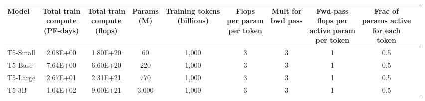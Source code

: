 \documentclass{article}
\begin{document}
\begin{table}[!h]

\begin{adjustwidth}{-.6in}{-.6in}
{
    \tiny
    \centering
        \footnotesize
        \begin{center}
            \begin{tabular}{lccccccccc}
                     Model & \shortstack{Total train\\ compute \\ (PF-days)} & \shortstack{Total train \\compute \\ (flops)} & \shortstack{Params \\(M)} & \shortstack{Training tokens\\ (billions)} & \shortstack{Flops \\ per param \\ per token} & \shortstack{Mult for\\ bwd pass} & \shortstack{Fwd-pass \\ flops per \\ active param \\ per token} & \shortstack{Frac of\\ params active\\ for each\\ token} \\
            \midrule
                  T5-Small &                      2.08E+00 &                    1.80E+20 &         60 &                      1,000 &                               3 &                       3 &                                         1 &                                      0.5 &   \\
                   T5-Base &                      7.64E+00 &                    6.60E+20 &        220 &                      1,000 &                               3 &                       3 &                                         1 &                                      0.5 &   \\
                  T5-Large &                      2.67E+01 &                    2.31E+21 &        770 &                      1,000 &                               3 &                       3 &                                         1 &                                      0.5 &   \\
                     T5-3B &                      1.04E+02 &                    9.00E+21 &      3,000 &                      1,000 &                               3 &                       3 &                                         1 &                                      0.5 &   \\

\end{tabular}
\end{center}}
\end{adjustwidth}
\end{table}
\end{document}
